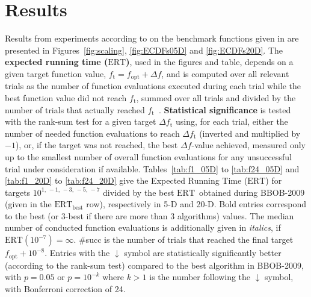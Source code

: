 \documentclass{article}
\newcommand{\ERT}{\ensuremath{\mathrm{ERT}}}
\newcommand{\Df}{\ensuremath{\Delta f}}
\newcommand{\fopt}{\ensuremath{f_\mathrm{opt}}}
\newcommand{\ftarget}{\ensuremath{f_\mathrm{t}}}
\begin{document}
\section{Results}
Results from experiments according to \cite{hansen2010exp} on the benchmark
functions given in \cite{wp200901_2010,hansen2010fun} are presented in 
Figures~\ref{fig:scaling}, \ref{fig:ECDFs05D} and \ref{fig:ECDFs20D}.
The \textbf{expected running time (\ERT)}, used in the figures and table,
depends on a given target function value, $\ftarget=\fopt+\Df$, and is computed
over all relevant trials as the number of function evaluations executed during
each trial while the best function value did not reach \ftarget, summed over
all trials and divided by the number of trials that actually reached \ftarget\
\cite{hansen2010exp,price1997dev}.
\textbf{Statistical significance} is tested with the rank-sum test for a given
target $\Delta\ftarget$ using, for each trial, either the number of needed
function evaluations to reach $\Delta\ftarget$ (inverted and multiplied by
$-1$), or, if the target was not reached, the best $\Df$-value achieved,
measured only up to the smallest number of overall function evaluations for any
unsuccessful trial under consideration if available.
Tables~\ref{tab:f1_05D} to \ref{tab:f24_05D} and \ref{tab:f1_20D} to \ref{tab:f24_20D}
give the Expected Running Time (\ERT) for targets $10^{1,\,-1,\,-3,\,-5,\,-7}$
divided by the best \ERT\ obtained during BBOB-2009 (given in the
\ERT$_{\text{best}}$ row), respectively in 5-D and 20-D.
Bold entries correspond to the best (or 3-best if there are more than 3
algorithms) values.
The median number of conducted function evaluations is additionally given in
\textit{italics}, if $\ERT(10^{-7}) =\infty$.
\#succ is the number of trials that reached the final target $\fopt + 10^{-8}$.
Entries with the $\downarrow$ symbol are statistically significantly better 
(according to the rank-sum test) compared to the best algorithm in BBOB-2009,
with $p=0.05$ or $p=10^{-k}$ where $k>1$ is the number
following the $\downarrow$ symbol, with Bonferroni correction of 24.
\end{document}
